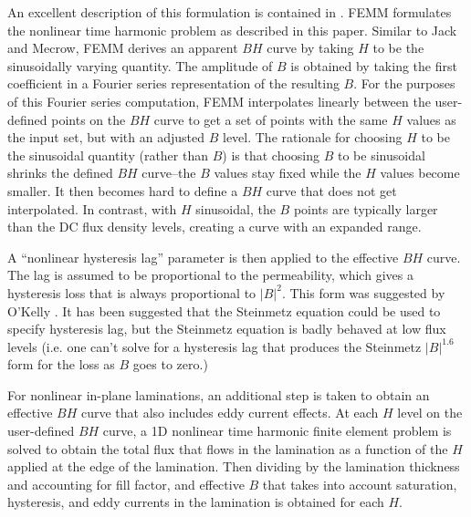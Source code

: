 \documentclass[12pt]{report}
\begin{document}
An excellent description of this formulation is contained in
\cite{jackmecrow}. FEMM formulates the nonlinear time harmonic
problem as described in this paper. Similar to Jack and Mecrow,
FEMM derives an apparent $BH$ curve by taking $H$ to be the
sinusoidally varying quantity. The amplitude of $B$ is obtained by
taking the first coefficient in a Fourier series representation of
the resulting $B$. For the purposes of this Fourier series
computation, FEMM interpolates linearly between the user-defined
points on the $BH$ curve to get a set of points with the same $H$
values as the input set, but with an adjusted $B$ level. The
rationale for choosing $H$ to be the sinusoidal quantity (rather
than $B$) is that choosing $B$ to be sinusoidal shrinks the defined
$BH$ curve--the $B$ values stay fixed while the $H$ values become
smaller. It then becomes hard to define a $BH$ curve that does not
get interpolated. In contrast, with $H$ sinusoidal, the $B$ points
are typically larger than the DC flux density levels, creating a
curve with an expanded range.

A ``nonlinear hysteresis lag'' parameter is then applied to the
effective $BH$ curve. The lag is assumed to be proportional to the
permeability, which gives a hysteresis loss that is always
proportional to $|B|^2$. This form was suggested by O'Kelly \cite{okelly}.
It has been suggested that the Steinmetz
equation could be used to specify hysteresis lag, but the Steinmetz
equation is badly behaved at low flux levels (i.e. one can't solve
for a hysteresis lag that produces the Steinmetz $|B|^{1.6}$ form
for the loss as $B$ goes to zero.)

For nonlinear in-plane laminations, an additional step is taken to
obtain an effective $BH$ curve that also includes eddy current
effects. At each $H$ level on the user-defined $BH$ curve, a 1D
nonlinear time harmonic finite element problem is solved to obtain
the total flux that flows in the lamination as a function of the
$H$ applied at the edge of the lamination. Then dividing by the
lamination thickness and accounting for fill factor, and effective
$B$ that takes into account saturation, hysteresis, and eddy
currents in the lamination is obtained for each $H$.
\end{document}

